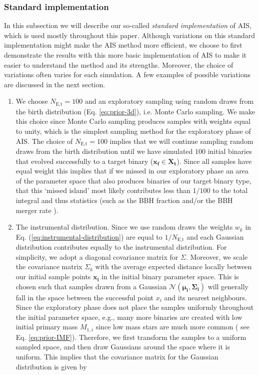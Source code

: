 \documentclass[a4paper,fleqn,usenatbib]{mnras}
\begin{document}
\subsubsection{Standard implementation}
In this subsection we will describe our so-called \emph{standard implementation} of AIS, which is used mostly throughout this paper. Although variations on this standard implementation might make the AIS method more efficient, we choose to first demonstrate the results with this more basic implementation of AIS to make it easier to understand the method and its strengths. Moreover, the choice of variations often varies for each simulation. A few examples of possible variations are discussed in the next section. 

\begin{enumerate}
	\item We choose $ N_{\text{E,t}} = 100 $ and an exploratory sampling using random draws from the birth distribution (Eq. \ref{eq:prior-3d}), i.e. Monte Carlo sampling.  We make this choice since Monte Carlo sampling produces samples with weights equal to unity, which  is the simplest sampling method for the exploratory phase of AIS. The choice of $ N_{\text{E,t}} = 100 $ implies that we will continue sampling random draws from the birth distribution until we have simulated $100$ initial binaries that evolved successfully to a target binary ($\mathbf{x_f} \in \mathbf{X_t}$). Since all samples have equal weight this implies that if we missed in our exploratory phase an area of the parameter space that also produces binaries of our target binary type, that this `missed island' most likely contributes less than $1/100$ to the total integral and thus statistics (such as the BBH fraction and/or the BBH merger rate ). 
	
	\item The instrumental distribution. Since we use random draws the weights $w_k$ in Eq. (\ref{eq:instrumental-distribution}) are equal to $ 1 / N_{\text{E,t}} $ and each Gaussian distribution contributes equally to the instrumental distribution. 
For simplicity, we  adopt a diagonal covariance matrix for $\Sigma$. Moreover, we scale the covariance matrix $\Sigma_k$  with the average expected distance locally between our initial sample points $ \mathbf{x_i}$ in the initial binary parameter space. This is chosen such that samples drawn from a Gaussian $\mathcal{N}({\boldsymbol {\mu _{i},\Sigma _{i}}})$  will generally fall in the space between the successful point  $x_i$ and its nearest neighbours.  Since the exploratory phase does not place the samples uniformly throughout the initial parameter space, e.g., many more binaries are created with low initial primary mass $M_{1,i}$ since low mass stars are much more common ( see  Eq. \ref{eq:prior-IMF}).
Therefore, we first transform the samples to a uniform sampled space, and then draw Gaussians around the space where it is uniform. This implies that the covariance matrix for the Gaussian distribution is given by


\end{enumerate}
\end{document}
